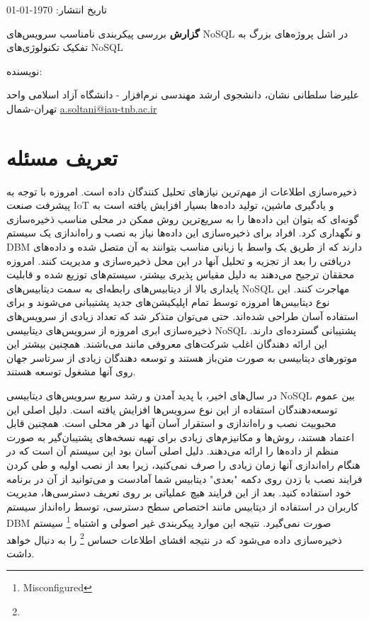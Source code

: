 \documentclass[10pt, a4paper]{article}
\begin{document}
تاریخ انتشار: \today

\textbf{گزارش} بررسی پیکربندی نامناسب سرویس‌های NoSQL در اشل پروژه‌های بزرگ به
تفکیک تکنولوژی‌های NoSQL

نویسنده:

علیرضا سلطانی نشان، دانشجوی ارشد مهندسی نرم‌افزار - دانشگاه آزاد اسلامی واحد
تهران-شمال \href{mailto:a.soltani@iau-tnb.ac.ir}{a.soltani@iau-tnb.ac.ir}


\section{تعریف مسئله}

ذخیره‌سازی اطلاعات از مهم‌ترین نیاز‌های تحلیل کنندگان داده است. امروزه با توجه
به پیشرفت صنعت IoT و یادگیری ماشین، تولید داده‌ها بسیار افزایش یافته است به
گونه‌ای که بتوان این داده‌ها را به سریع‌ترین روش ممکن در محلی مناسب ذخیره‌سازی و
نگهداری کرد.  افراد برای ذخیره‌سازی این داده‌ها نیاز به نصب و راه‌اندازی یک
سیستم DBM دارند که از طریق یک واسط با زبانی مناسب بتوانند به آن متصل شده و
داده‌های دریافتی را بعد از تجزیه و تحلیل آنها در این محل ذخیره‌سازی و مدیریت
کنند. امروزه محققان ترجیح می‌دهند به دلیل مقیاس پذیری بیشتر، سیستم‌های توزیع شده
و قابلیت پایداری بالا از دیتابیس‌های رابطه‌ای به سمت دیتابیس‌های NoSQL مهاجرت
کنند.  این نوع دیتابیس‌ها امروزه توسط تمام اپلیکیشن‌های جدید پشتیبانی می‌شوند و
برای استفاده آسان طراحی شده‌اند. حتی می‌توان متذکر شد که تعداد زیادی از
سرویس‌های ذخیره‌سازی ابری امروزه‌ از سرویس‌های دیتابیسی NoSQL پشتیبانی گسترده‌ای
دارند. این ارائه دهندگان اغلب شرکت‌های معروفی مانند 
  می‌باشند. همچنین بیشتر این
موتور‌های دیتابیسی به صورت متن‌باز هستند و توسعه دهندگان زیادی از سرتاسر جهان
روی آنها مشغول توسعه هستند.

در سال‌های اخیر، با پدید آمدن و رشد سریع سرویس‌های دیتابیسی NoSQL بین عموم
توسعه‌دهندگان استفاده از این نوع سرویس‌ها افزایش یافته است. دلیل اصلی این
محبوبیت نصب و راه‌اندازی و استقرار آسان آنها در هر محلی است. همچنین قابل اعتماد
هستند، روش‌ها و مکانیزم‌های زیادی برای تهیه نسخه‌های پشتیبان‌گیر به صورت منظم از
داده‌ها را ارائه می‌دهند. دلیل اصلی آسان بود این سیستم آن است که در هنگام
راه‌اندازی آنها زمان زیادی را صرف نمی‌کنید، زیرا بعد از نصب اولیه و طی کردن
فرایند نصب با زدن روی دکمه "بعدی" دیتابیس شما آمادست و می‌توانید از آن در برنامه
خود استفاده کنید. بعد از این فرایند هیچ عملیاتی بر روی تعریف دسترسی‌ها، مدیریت
کاربران در استفاده از دیتابیس مانند اختصاص سطح دسترسی، توسط راه‌انداز سیستم DBM
صورت نمی‌گیرد. نتیجه این موارد پیکربندی غیر اصولی و اشتباه
\footnote{Misconfigured} سیستم ذخیره‌سازی داده می‌شود که در نتیجه افشای اطلاعات
حساس \footnote{} را به دنبال خواهد داشت.
\end{document}
